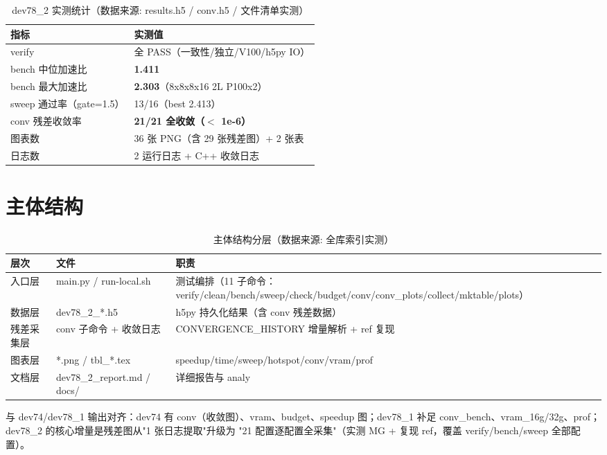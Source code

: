 \documentclass[UTF8]{ctexart}
\begin{document}
\begin{table}[htbp]\centering
\small
\begin{tabular}{ll}
\toprule
指标 & 实测值 \\
\midrule
verify & 全 PASS（一致性/独立/V100/h5py IO） \\
bench 中位加速比 & \textbf{1.411} \\
bench 最大加速比 & \textbf{2.303}（8x8x8x16 2L P100x2） \\
sweep 通过率（gate=1.5） & 13/16（best 2.413） \\
conv 残差收敛率 & \textbf{21/21 全收敛（$<$ 1e-6）} \\
图表数 & 36 张 PNG（含 29 张残差图）+ 2 张表 \\
日志数 & 2 运行日志 + C++ 收敛日志 \\
\bottomrule
\end{tabular}
\caption{dev78\_2 实测统计（数据来源: results.h5 / conv.h5 / 文件清单实测）}
\end{table}

\section{主体结构}
\begin{table}[htbp]\centering
\begin{tabularx}{\textwidth}{llX}
\toprule
\textcolor{struct}{层次} & 文件 & \textcolor{struct}{职责} \\
\midrule
入口层 & main.py / run-local.sh & 测试编排（11 子命令：verify/clean/bench/sweep/check/budget/conv/conv\_plots/collect/mktable/plots） \\
数据层 & dev78\_2\_*.h5 & h5py 持久化结果（含 conv 残差数据） \\
残差采集层 & conv 子命令 + 收敛日志 & CONVERGENCE\_HISTORY 增量解析 + ref 复现 \\
图表层 & *.png / tbl\_*.tex & speedup/time/sweep/hotspot/conv/vram/prof \\
文档层 & dev78\_2\_report.md / docs/ & 详细报告与 analy \\
\bottomrule
\end{tabularx}
\caption{主体结构分层（数据来源: 全库索引实测）}
\end{table}

与 dev74/dev78\_1 输出对齐：dev74 有 conv（收敛图）、vram、budget、speedup
图；dev78\_1 补足 conv\_bench、vram\_16g/32g、prof；
\textcolor{struct}{dev78\_2 的核心增量是残差图从"1 张日志提取"升级为
"21 配置逐配置全采集"}（实测 MG + 复现 ref，覆盖 verify/bench/sweep
全部配置）。
\end{document}
